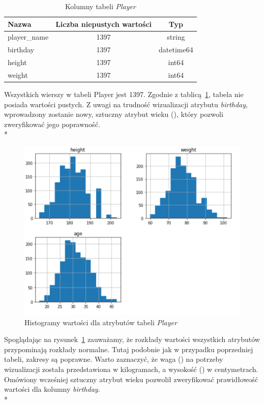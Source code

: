     \begin{table}[H]
    \caption{Kolumny tabeli \emph{Player}}\label{tab:player}
    \centering\footnotesize%
    \begin{tabular}{l c c}
    \toprule
        Nazwa & Liczba niepustych wartości & Typ \\
    \midrule
        player\_name & 1397 & string \\
        birthday & 1397 & datetime64 \\
        height & 1397 & int64 \\
        weight & 1397 & int64 \\
    \bottomrule
    \end{tabular}
    \end{table}
    
    \noindent Wszystkich wierszy w tabeli Player jest 1397. Zgodnie z tablicą~\ref{tab:player}, tabela nie posiada wartości pustych. Z uwagi na trudność wizualizacji atrybutu \emph{birthday}, wprowadzony zostanie nowy, sztuczny atrybut wieku (), który pozwoli zweryfikować jego poprawność. \\*
    
    \begin{figure}[H] 
        \centering\includegraphics[width=\textwidth]{figures/player.png}
        \caption{Histogramy wartości dla atrybutów tabeli \emph{Player}}
        \label{fig:player}
    \end{figure}
    
    \noindent Spoglądając na rysunek~\ref{fig:player} zauważamy, że rozkłady wartości wszystkich atrybutów przypominają rozkłady normalne. Tutaj podobnie jak w przypadku poprzedniej tabeli, zakresy są poprawne. Warto zaznaczyć, że waga () na potrzeby wizualizacji została przedstawiona w kilogramach, a wysokość () w centymetrach. Omówiony wcześniej sztuczny atrybut wieku pozwolił zweryfikować prawidłowość wartości dla kolumny \textit{birthday}. \\*
    
